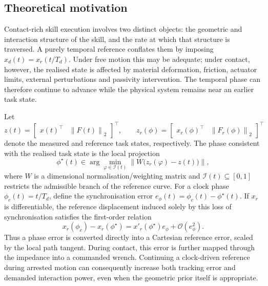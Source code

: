 \documentclass[11pt,a4paper]{article}
\newcommand{\norm}[1]{\left\lVert#1\right\rVert}
\begin{document}
\subsection{Theoretical motivation}
Contact-rich skill execution involves two distinct objects: the geometric and
interaction structure of the skill, and the rate at which that structure is
traversed.  A purely temporal reference conflates them by imposing
$x_d(t)=x_r(t/T_d)$.  Under free motion this may be adequate; under contact,
however, the realised state is affected by material deformation, friction,
actuator limits, external perturbations and passivity intervention.  The
temporal phase can therefore continue to advance while the physical system
remains near an earlier task state.

Let
\begin{equation}
z(t)=\begin{bmatrix}x(t)^\top&\norm{F(t)}_2\end{bmatrix}^{\!\top},
\qquad
z_r(\phi)=
\begin{bmatrix}x_r(\phi)^\top&\norm{F_r(\phi)}_2\end{bmatrix}^{\!\top}
\label{eq:phase_augmented_state}
\end{equation}
denote the measured and reference task states, respectively.  The phase
consistent with the realised task state is the local projection
\begin{equation}
\phi^\star(t)\in
\arg\min_{\varphi\in\mathcal I(t)}
\norm{W\big(z_r(\varphi)-z(t)\big)} ,
\label{eq:ideal_state_phase}
\end{equation}
where $W$ is a dimensional normalisation/weighting matrix and
$\mathcal I(t)\subseteq[0,1]$ restricts the admissible branch of the reference
curve.  For a clock phase $\phi_c(t)=t/T_d$, define the synchronisation error
$e_\phi(t)=\phi_c(t)-\phi^\star(t)$.  If $x_r$ is differentiable, the reference
displacement induced solely by this loss of synchronisation satisfies the
first-order relation
\begin{equation}
x_r(\phi_c)-x_r(\phi^\star)
=x'_r(\phi^\star)e_\phi+\mathcal O(e_\phi^2).
\label{eq:phase_desynchronisation}
\end{equation}
Thus a phase error is converted directly into a Cartesian reference error,
scaled by the local path tangent.  During contact, this error is further mapped
through the impedance into a commanded wrench.  Continuing a clock-driven
reference during arrested motion can consequently increase both tracking
error and demanded interaction power, even when the geometric prior itself is
appropriate.
\end{document}
